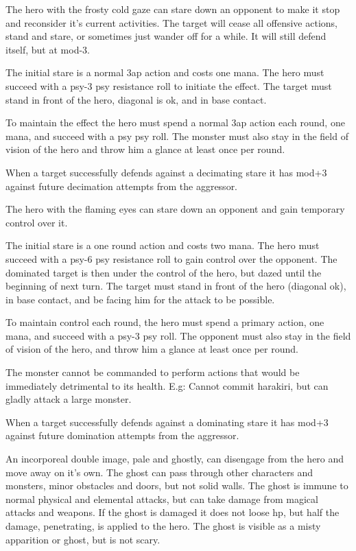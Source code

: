  The hero with the frosty cold gaze can stare down an opponent to make it stop and reconsider it's current activities. The target will cease all offensive actions, stand and stare, or sometimes just wander off for a while. It will still defend itself, but at mod-3.

The initial stare is a normal 3ap action and costs one mana. The hero must succeed with a psy-3 \vs psy resistance roll to initiate the effect. The target must stand in front of the hero, diagonal is ok, and in base contact.

To maintain the effect the hero must spend a normal 3ap action each round, one mana, and succeed with a psy \vs psy roll. The monster must also stay in the field of vision of the hero and throw him a glance at least once per round.

When a target successfully defends against a decimating stare it has mod+3 against future decimation attempts from the aggressor.


 The hero with the flaming eyes can stare down an opponent and gain temporary control over it.

The initial stare is a one round action and costs two mana. The hero must succeed with a psy-6 \vs psy resistance roll to gain control over the opponent. The dominated target is then under the control of the hero, but dazed until the beginning of next turn. The target must stand in front of the hero (diagonal ok), in base contact, and be facing him for the attack to be possible.

To maintain control each round, the hero must spend a primary action, one mana, and succeed with a psy-3 \vs psy roll. The opponent must also stay in the field of vision of the hero, and throw him a glance at least once per round.

The monster cannot be commanded to perform actions that would be immediately detrimental to its health. E.g: Cannot commit harakiri, but can gladly attack a large monster.

When a target successfully defends against a dominating stare it has mod+3 against future domination attempts from the aggressor.


 An incorporeal double image, pale and ghostly, can disengage from the hero and move away on it's own. The ghost can pass through other characters and monsters, minor obstacles and doors, but not solid walls. The ghost is immune to normal physical and elemental attacks, but can take damage from magical attacks and weapons. If the ghost is damaged it does not loose hp, but half the damage, penetrating, is applied to the hero. The ghost is visible as a misty apparition or ghost, but is not scary.

